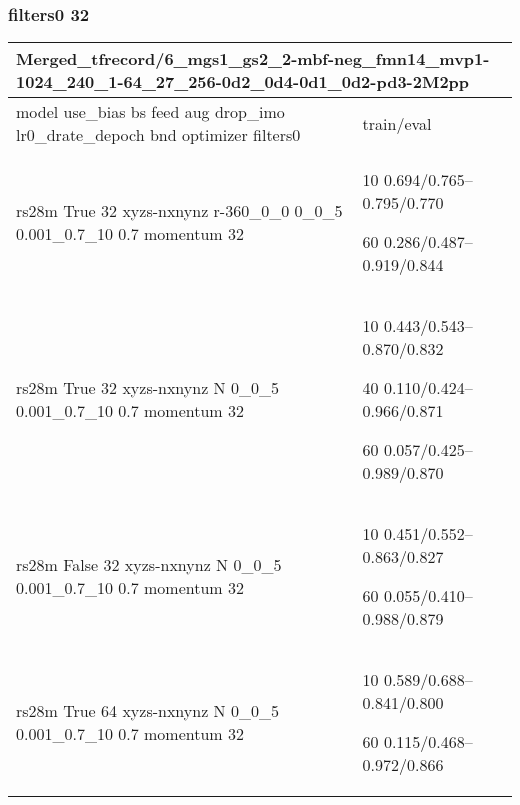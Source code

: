 \documentclass[,table,dvipsnames]{article}
\begin{document}
\subsubsection{filters0 32}
\noindent\begin{tabular}{|p{10cm}|p{5cm}| }	
	\hline
	\multicolumn{2}{|p{15cm}|}{Merged\_tfrecord/6\_mgs1\_gs2\_2-mbf-neg\_fmn14\_mvp1-1024\_240\_1-64\_27\_256-0d2\_0d4-0d1\_0d2-pd3-2M2pp}\\
	\hline
	model use\_bias bs feed aug drop\_imo lr0\_drate\_depoch bnd optimizer filters0 & train/eval \\
	
	\rowcolor{green!20}
	rs28m True 32 xyzs-nxnynz r-360\_0\_0 0\_0\_5 0.001\_0.7\_10 0.7 momentum 32& 10 0.694/0.765--0.795/0.770\par60 0.286/0.487--0.919/0.844\\ 
	
	\rowcolor{orange!20}
	rs28m True 32 xyzs-nxnynz N 0\_0\_5 0.001\_0.7\_10 0.7 momentum 32& 10 0.443/0.543--0.870/0.832\par 40 0.110/0.424--0.966/0.871\par 60 0.057/0.425--0.989/0.870\\ 
	
	\rowcolor{yellow}
	rs28m False 32 xyzs-nxnynz N 0\_0\_5 0.001\_0.7\_10 0.7 momentum 32& 10 0.451/0.552--0.863/0.827\par 60 0.055/0.410--0.988/0.879\\
	
	\rowcolor{blue!20}
	rs28m True 64 xyzs-nxnynz N 0\_0\_5 0.001\_0.7\_10 0.7 momentum 32& 10 0.589/0.688--0.841/0.800\par 60 0.115/0.468--0.972/0.866\\
	
	\hline 
\end{tabular}
\end{document}
